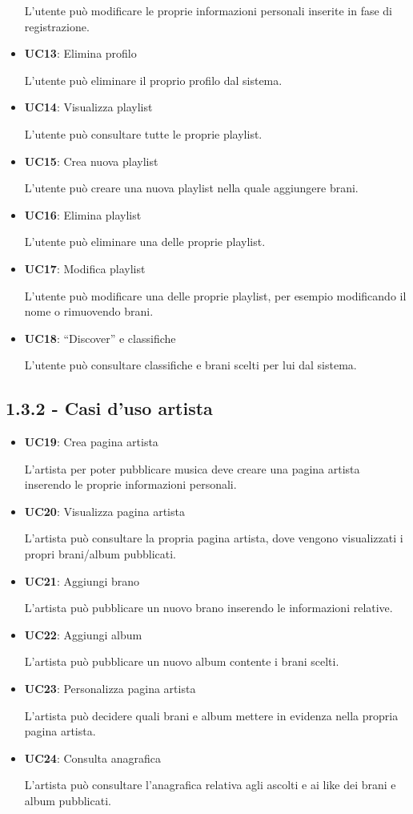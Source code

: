 \begin{itemize}
        L’utente può modificare le proprie informazioni personali inserite in fase di registrazione.
    \item \textbf{UC13}: Elimina profilo \par 
        L’utente può eliminare il proprio profilo dal sistema. 
    \item \textbf{UC14}: Visualizza playlist \par 
        L’utente può consultare tutte le proprie playlist.
    \item \textbf{UC15}: Crea nuova playlist \par 
        L’utente può creare una nuova playlist nella quale aggiungere brani.
    \item \textbf{UC16}: Elimina playlist \par 
        L’utente può eliminare una delle proprie playlist.
    \item \textbf{UC17}: Modifica playlist \par 
        L’utente può modificare una delle proprie playlist, per esempio modificando il nome o rimuovendo brani.
    \item \textbf{UC18}: “Discover” e classifiche \par 
        L’utente può consultare classifiche e brani scelti per lui dal sistema.
    
\end{itemize}

\newpage

\subsection*{1.3.2 - Casi d'uso artista}
\begin{itemize}
    \item \textbf{UC19}: Crea pagina artista \par 
        L’artista per poter pubblicare musica deve creare una pagina artista inserendo le proprie informazioni personali.
    \item  \textbf{UC20}: Visualizza pagina artista \par
        L’artista può consultare la propria pagina artista, dove vengono visualizzati i propri brani/album pubblicati.
    \item  \textbf{UC21}: Aggiungi brano \par 
        L’artista può pubblicare un nuovo brano inserendo le informazioni relative.
    \item  \textbf{UC22}: Aggiungi album \par
        L’artista può pubblicare un nuovo album contente i brani scelti.
    \item  \textbf{UC23}: Personalizza pagina artista \par 
        L’artista può decidere quali brani e album mettere in evidenza nella propria pagina artista. 
    \item  \textbf{UC24}: Consulta anagrafica \par 
        L’artista può consultare l’anagrafica relativa agli ascolti e ai like dei brani e album pubblicati. 
    
\end{itemize}



